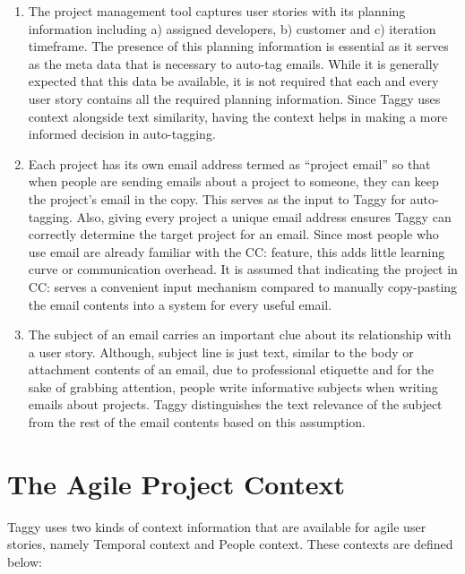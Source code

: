\begin{enumerate}
	\item The project management tool captures user stories with its planning information including a) assigned developers, b) customer and c) iteration timeframe. The presence of this planning information is essential as it serves as the meta data that is necessary to auto-tag emails. While it is generally expected that this data be available, it is not required that each and every user story contains all the required planning information. Since Taggy uses context alongside text similarity, having the context helps in making a more informed decision in auto-tagging.
	
	\item Each project has its own email address termed as ``project email'' so that when people are sending emails about a project to someone, they can keep the project's email in the copy. This serves as the input to Taggy for auto-tagging. Also, giving every project a unique email address ensures Taggy can correctly determine the target project for an email. Since most people who use email are already familiar with the CC: feature, this adds little learning curve or communication overhead. It is assumed that indicating the project in CC: serves a convenient input mechanism compared to manually copy-pasting the email contents into a system for every useful email.		
	
	\item The subject of an email carries an important clue about its relationship with a user story. Although, subject line is just text, similar to the body or attachment contents of an email, due to professional etiquette and for the sake of grabbing attention, people write informative subjects when writing emails about projects. Taggy distinguishes the text relevance of the subject from the rest of the email contents based on this assumption.
\end{enumerate}



\section{The Agile Project Context}
Taggy uses two kinds of context information that are available for agile user stories, namely Temporal context and People context. These contexts are defined below:

